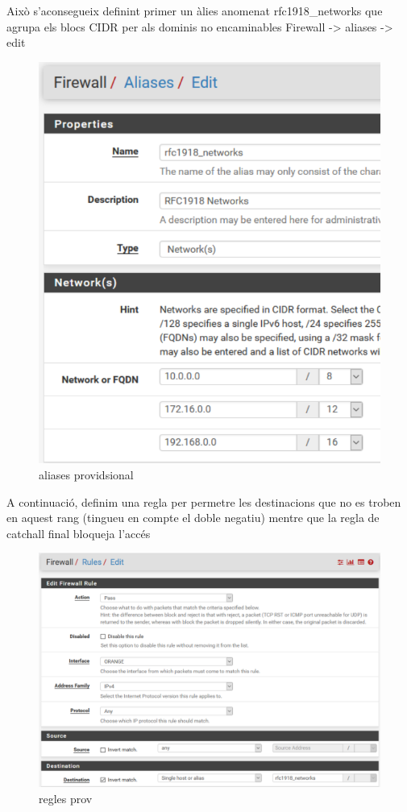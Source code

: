 \documentclass[
  10pt,
]{krantz}
\begin{document}
Això s'aconsegueix definint primer un àlies anomenat rfc1918\_networks que agrupa els blocs CIDR per als dominis no encaminables Firewall -\textgreater{} aliases -\textgreater{} edit

\begin{figure}
\centering
\includegraphics{imatges/pfsense_aliase_prov.png}
\caption{aliases providsional}
\end{figure}

A continuació, definim una regla per permetre les destinacions que no es troben en aquest rang (tingueu en compte el doble negatiu) mentre que la regla de catchall final bloqueja l'accés

\begin{figure}
\centering
\includegraphics{imatges/regles prov.png}
\caption{regles prov}
\end{figure}
\end{document}

